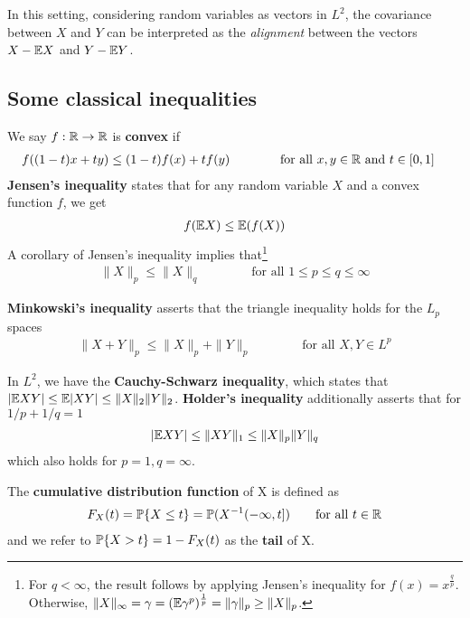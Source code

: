 In this setting, considering random variables as vectors in $L^2$, the covariance between $X$ and $Y$ can be interpreted as the \textit{alignment} between the vectors $X - \E X$ and $Y - \E Y$.

\subsection{Some classical inequalities}

We say $f : \R \to \R$ is \textbf{convex} if
\begin{align*}
    f((1-t)x + ty) \leq (1-t)f(x) + tf(y) &\qquad\qquad\text{for all $x,y\in\R$ and $t\in[0,1]$}
\end{align*}
\textbf{Jensen's inequality} states that for any random variable $X$ and a convex function $f$, we get 
\begin{align*}
    f(\E X) \leq \E(f(X))
\end{align*}
A corollary of Jensen's inequality implies that\footnote{For $q < \infty$, the result follows by applying Jensen's inequality for $f(x) = x^{\frac q p}$. Otherwise, $\|X\|_\infty = \gamma = (\E \gamma^{p})^{\frac1p} = \|\gamma\|_p \geq \|X\|_p$.}
\begin{align*}
    \| X\|_p \leq \|X\|_q \qquad\qquad\text{for all $1\leq p \leq q\leq \infty$}
\end{align*}

\textbf{Minkowski's inequality} asserts that the triangle inequality holds for the $L_p$ spaces
\begin{align*}
\|X +  Y\|_p \leq \|X\|_p + \|Y\|_p \qquad\qquad\text{for all $X,Y \in L^p$}
\end{align*}

In $L^2$, we have the \textbf{Cauchy-Schwarz inequality}, which states that $|\E XY| \leq \E |XY| \leq \|X\|_2 \|Y\|_2$. \textbf{Holder's inequality} additionally asserts that for $1/p + 1/q =1$
\begin{align*}
    |\E X Y| \leq \|XY\|_1 \leq \|X\|_p\|Y\|_q
\end{align*}
which also holds for $p=1, q=\infty$.

The \textbf{cumulative distribution function} of X is defined as
\begin{align*}
    F_X(t) = \P\{X \leq t\} = \P(X^{-1}(-\infty,t]) \qquad\text{for all $t\in\R$}
\end{align*}
and we refer to $\P\{X > t\} = 1 - F_X(t)$ as the \textbf{tail} of X.



